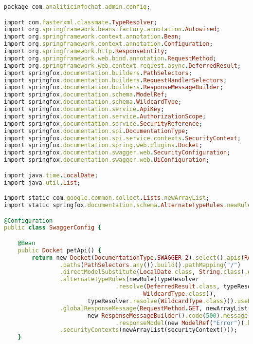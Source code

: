 \begin{lstlisting}[language=Ruby, style=rubystyle]
package com.analiticinfochat.admin.config;

import com.fasterxml.classmate.TypeResolver;
import org.springframework.beans.factory.annotation.Autowired;
import org.springframework.context.annotation.Bean;
import org.springframework.context.annotation.Configuration;
import org.springframework.http.ResponseEntity;
import org.springframework.web.bind.annotation.RequestMethod;
import org.springframework.web.context.request.async.DeferredResult;
import springfox.documentation.builders.PathSelectors;
import springfox.documentation.builders.RequestHandlerSelectors;
import springfox.documentation.builders.ResponseMessageBuilder;
import springfox.documentation.schema.ModelRef;
import springfox.documentation.schema.WildcardType;
import springfox.documentation.service.ApiKey;
import springfox.documentation.service.AuthorizationScope;
import springfox.documentation.service.SecurityReference;
import springfox.documentation.spi.DocumentationType;
import springfox.documentation.spi.service.contexts.SecurityContext;
import springfox.documentation.spring.web.plugins.Docket;
import springfox.documentation.swagger.web.SecurityConfiguration;
import springfox.documentation.swagger.web.UiConfiguration;

import java.time.LocalDate;
import java.util.List;

import static com.google.common.collect.Lists.newArrayList;
import static springfox.documentation.schema.AlternateTypeRules.newRule;

@Configuration
public class SwaggerConfig {

    @Bean
    public Docket petApi() {
        return new Docket(DocumentationType.SWAGGER_2).select().apis(RequestHandlerSelectors.any())
                .paths(PathSelectors.any()).build().pathMapping("/")
                .directModelSubstitute(LocalDate.class, String.class).genericModelSubstitutes(ResponseEntity.class)
                .alternateTypeRules(newRule(typeResolver
                                .resolve(DeferredResult.class, typeResolver.resolve(ResponseEntity.class,
                                        WildcardType.class)),
                        typeResolver.resolve(WildcardType.class))).useDefaultResponseMessages(false)
                .globalResponseMessage(RequestMethod.GET, newArrayList(
                        new ResponseMessageBuilder().code(500).message("500 message")
                                .responseModel(new ModelRef("Error")).build())).securitySchemes(newArrayList(apiKey()))
                .securityContexts(newArrayList(securityContext()));
    }


\end{lstlisting}
